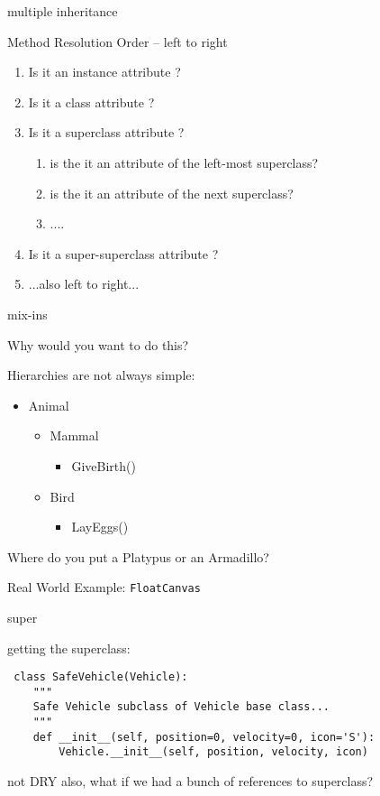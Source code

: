 \documentclass{beamer}
\begin{document}
\begin{frame}[fragile]{multiple inheritance}

\vfill
{\Large Method Resolution Order -- left to right}

\begin{enumerate}
  \item Is it an instance attribute ?
  \item Is it a class attribute ?
  \item Is it a superclass attribute ?
  \begin{enumerate}
     \item is the it an attribute of the left-most superclass?
     \item is the it an attribute of the next superclass?
     \item ....
  \end{enumerate}
  \item Is it a super-superclass attribute ?
  \item ...also left to right...
\end{enumerate}

\end{frame} 

\begin{frame}[fragile]{mix-ins}

{\Large Why would you want to do this?}

\vfill
{\Large Hierarchies are not always simple:}
\vfill
\begin{itemize}
  \item Animal
  \begin{itemize}
    \item Mammal
    \begin{itemize}
      \item GiveBirth()
    \end{itemize}
    \item Bird
    \begin{itemize}
      \item LayEggs()
    \end{itemize}
  \end{itemize}
\end{itemize}
\vfill
{\Large Where do you put a Platypus or an Armadillo?}

\vfill
{\Large Real World Example: \verb|FloatCanvas|}
\end{frame} 


\begin{frame}[fragile]{super}

{\Large getting the superclass:}
\begin{verbatim}
￼class SafeVehicle(Vehicle):
    """
    Safe Vehicle subclass of Vehicle base class...
    """
    def __init__(self, position=0, velocity=0, icon='S'):
        Vehicle.__init__(self, position, velocity, icon)
\end{verbatim}

{\Large
\vfill
not DRY
\vfill
also, what if we had a bunch of references to superclass?
}
\end{frame} 
\end{document}
